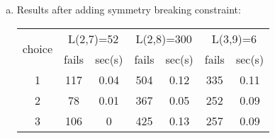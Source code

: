 \documentclass[a4paper,12pt]{article}
\begin{document}
\begin{enumerate}[1.]
\begin{enumerate}[(a)]
  \item
Results after adding symmetry breaking constraint:
\begin{table}[!ht]
\centering
\begin{tabular}{|c|c|c|c|c|c|c|}
\hline
\multirow{2}{*}{choice} & \multicolumn{2}{|c|}{L(2,7)=52} & \multicolumn{2}{|c|}{L(2,8)=300} & \multicolumn{2}{|c|}{L(3,9)=6}\\
\cline{2-7}
                        & fails & sec(s)            & fails & sec(s)            & fails & sec(s)\\
\hline
1 & 117 & 0.04 & 504 & 0.12 & 335 & 0.11\\
\hline
2 & 78  & 0.01 & 367 & 0.05 & 252 & 0.09\\
\hline
3 & 106 & 0    & 425 & 0.13 & 257 & 0.09\\
\hline
\end{tabular}
\end{table}
\end{enumerate}
\end{enumerate}
\end{document}
